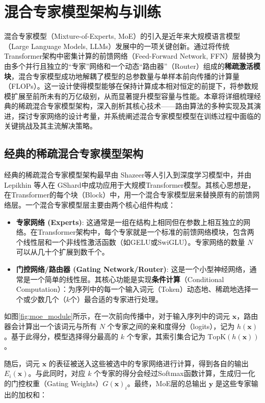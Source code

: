 \chapter{混合专家模型架构与训练}
\label{chap:mox_training}

混合专家模型（Mixture-of-Experts, MoE）的引入是近年来大规模语言模型（Large Language Models, LLMs）发展中的一项关键创新。通过将传统Transformer架构中密集计算的前馈网络（Feed-Forward Network, FFN）层替换为由多个并行且独立的“专家”网络和一个动态“路由器”（Router）组成的\textbf{稀疏激活模块}，混合专家模型成功地解耦了模型的总参数量与单样本前向传播的计算量（FLOPs）。这一设计使得模型能够在保持计算成本相对恒定的前提下，将参数规模扩展至前所未有的万亿级别，从而显著提升模型容量与性能。本章将详细梳理经典的稀疏混合专家模型架构，深入剖析其核心技术——路由算法的多种实现及其演进，探讨专家网络的设计考量，并系统阐述混合专家模型模型在训练过程中面临的关键挑战及其主流解决策略。

\section{经典的稀疏混合专家模型架构}

经典的稀疏混合专家模型架构最早由 Shazeer等人\cite{Shazeer2017OutrageouslyLN}引入到深度学习模型中，并由 Lepikhin 等人在 GShard\cite{Lepikhin2020GShardSG}中成功应用于大规模Transformer模型。其核心思想是，在Transformer的每个块（Block）中，用一个混合专家模型层来替换原有的前馈网络层。一个混合专家模型层主要由两个核心组件构成：
\begin{itemize}
    \item \textbf{专家网络 (Experts)}: 这通常是一组在结构上相同但在参数上相互独立的网络。在Transformer架构中，每个专家就是一个标准的前馈网络模块，包含两个线性层和一个非线性激活函数（如GELU或SwiGLU）。专家网络的数量 $N$ 可以从几十个扩展到数千个。
    \item \textbf{门控网络/路由器 (Gating Network/Router)}: 这是一个小型神经网络，通常是一个简单的线性层。其核心功能是实现\textbf{条件计算}（Conditional Computation）：为序列中的每一个输入词元（Token）动态地、稀疏地选择一个或少数几个（$k$个）最合适的专家进行处理。
\end{itemize}
如图\ref{fig:moe_module}所示，在一次前向传播中，对于输入序列中的词元 $\mathbf{x}$，路由器会计算出一个该词元与所有 $N$ 个专家之间的亲和度得分（logits），记为 $h(\mathbf{x})$。基于此得分，模型选择得分最高的 $k$ 个专家，其索引集合记为 $\text{TopK}(h(\mathbf{x}))$。

随后，词元 $\mathbf{x}$ 的表征被送入这些被选中的专家网络进行计算，得到各自的输出 $E_i(\mathbf{x})$。与此同时，对应 $k$ 个专家的得分会经过Softmax函数计算，生成归一化的门控权重（Gating Weights）$G(\mathbf{x})_i$。最终，MoE层的总输出 $\mathbf{y}$ 是这些专家输出的加权和：

